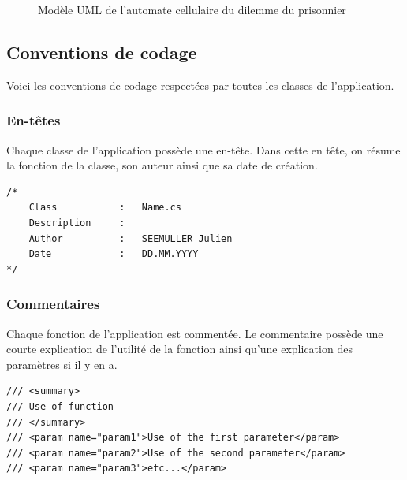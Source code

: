 \documentclass[a4paper, french]{article}
\begin{document}
\begin{figure}[htp]
    \caption{Modèle UML de l'automate cellulaire du dilemme du prisonnier}
\end{figure}

\pagebreak
\subsection{Conventions de codage}
Voici les conventions de codage respectées par toutes les classes de l'application.

\subsubsection{En-têtes}
Chaque classe de l'application possède une en-tête. Dans cette en tête, on résume la fonction de la classe, son auteur ainsi que sa date de création.

\begin{lstlisting}
/*
    Class           :   Name.cs
    Description     :   
    Author          :   SEEMULLER Julien
    Date            :   DD.MM.YYYY
*/
\end{lstlisting}

\subsubsection{Commentaires}
Chaque fonction de l'application est commentée. Le commentaire possède une courte explication de l'utilité de la fonction ainsi qu'une explication des paramètres si il y en a.

\begin{lstlisting}
/// <summary>
/// Use of function
/// </summary>
/// <param name="param1">Use of the first parameter</param>
/// <param name="param2">Use of the second parameter</param>
/// <param name="param3">etc...</param>
\end{lstlisting}
\end{document}
